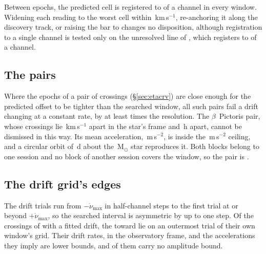 Between epochs, the predicted cell is registered to \RgBudgetChMed{} of a
channel in every window. Widening each reading to the worst cell within
\RgTolKms\,km\,s$^{-1}$, re-anchoring it along the discovery track, or
raising the bar to \ZtTrialThr{} changes no disposition, although
registration to a single channel is tested only on the unresolved line of
\RgRegStar, which registers to \RgRegMaxCh{} of a channel.

\subsection{The pairs}
\label{sec:pairacct}

Where the epochs of a pair of crossings (\S\ref{sec:etacrv}) are close
enough for the predicted offset to be tighter than the searched window, all
\TjNPower{} such pairs fail a drift changing at a constant rate, by at least
\TjSigMin{} times the resolution. The $\beta$~Pictoris pair, whose crossings
lie \TjBpDvKms\,km\,s$^{-1}$ apart in the star's frame and \TjBpDtH\,h apart,
cannot be dismissed in this way. Its mean acceleration,
\TjBpAccelReq\,m\,s$^{-2}$, is inside the \WdAGrid\,m\,s$^{-2}$ ceiling, and
a circular orbit of \ObDayBp\,d about the \EcMassBp\,M$_\odot$ star
\citep{Crifo1997} reproduces it. Both blocks belong to one session and no
block of another session covers the window, so the pair is \TjBpVerdict.

\subsection{The drift grid's edges}
\label{sec:edge}

The drift trials run from $-\dot\nu_{\max}$ in half-channel steps to the
first trial at or beyond $+\dot\nu_{\max}$, so the searched interval is
asymmetric by up to one step. Of the \EgNDrift{} crossings of \EgDriftPop{}
with a fitted drift, the \EgNEdge{} toward \EgEdgeStars{} lie on an
outermost trial of their own window's grid. Their drift rates, in the
observatory frame, and the accelerations they imply are lower bounds, and
\EgNEdgeOut{} of them carry no amplitude bound.
